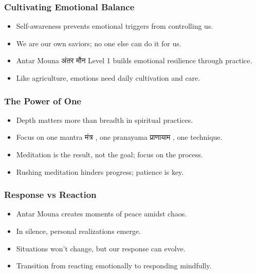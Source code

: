 \begin{frame}[fragile]\frametitle{Cultivating Emotional Balance}
    \begin{itemize}
        \item Self-awareness prevents emotional triggers from controlling us.
        \item We are our own saviors; no one else can do it for us.
        \item Antar Mouna अंतर मौन Level 1 builds emotional resilience through practice.
        \item Like agriculture, emotions need daily cultivation and care.
    \end{itemize}
\end{frame}

\begin{frame}[fragile]\frametitle{The Power of One}
    \begin{itemize}
        \item Depth matters more than breadth in spiritual practices.
        \item Focus on one mantra मंत्र , one pranayama प्राणायाम , one technique.
        \item Meditation is the result, not the goal; focus on the process.
        \item Rushing meditation hinders progress; patience is key.
    \end{itemize}
\end{frame}

\begin{frame}[fragile]\frametitle{Response vs Reaction}
    \begin{itemize}
        \item Antar Mouna creates moments of peace amidst chaos.
        \item In silence, personal realizations emerge.
        \item Situations won’t change, but our response can evolve.
        \item Transition from reacting emotionally to responding mindfully.
    \end{itemize}
\end{frame}


